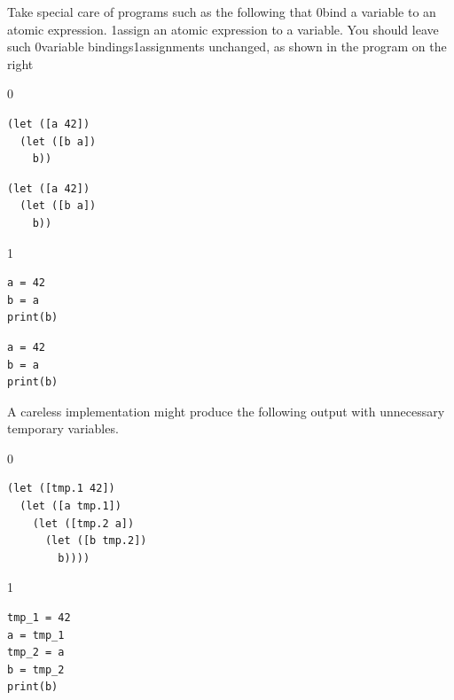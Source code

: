 \documentclass[7x10,nocrop]{TimesAPriori_MIT}%
\def\racketEd{0}
\def\pythonEd{1}
\def\edition{0}
\newcommand{\racket}[1]{{\if\edition\racketEd{#1}\fi}}
\newcommand{\python}[1]{{\if\edition\pythonEd #1\fi}}
\begin{document}
Take special care of programs such as the following that
%
\racket{bind a variable to an atomic expression.}
%
\python{assign an atomic expression to a variable.}
%
You should leave such \racket{variable bindings}\python{assignments}
unchanged, as shown in the program on the right\\
%
{\if\edition\racketEd
\begin{transformation}
\begin{lstlisting}
(let ([a 42])
  (let ([b a])
    b))
\end{lstlisting}
\compilesto
\begin{lstlisting}
(let ([a 42])
  (let ([b a])
    b))
\end{lstlisting}
\end{transformation}
\fi}
{\if\edition\pythonEd
\begin{transformation}
\begin{lstlisting}
a = 42
b = a
print(b)
\end{lstlisting}
\compilesto
\begin{lstlisting}
a = 42
b = a
print(b)
\end{lstlisting}
\end{transformation}
\fi}
%
\noindent A careless implementation might produce the following output with
unnecessary temporary variables.
\begin{center}
\begin{minipage}{0.4\textwidth}
{\if\edition\racketEd
\begin{lstlisting}
(let ([tmp.1 42])
  (let ([a tmp.1])
    (let ([tmp.2 a])
      (let ([b tmp.2])
        b))))
\end{lstlisting}
\fi}
{\if\edition\pythonEd
\begin{lstlisting}
tmp_1 = 42
a = tmp_1
tmp_2 = a
b = tmp_2
print(b)
\end{lstlisting}
\fi}
\end{minipage}
\end{center}
\end{document}
